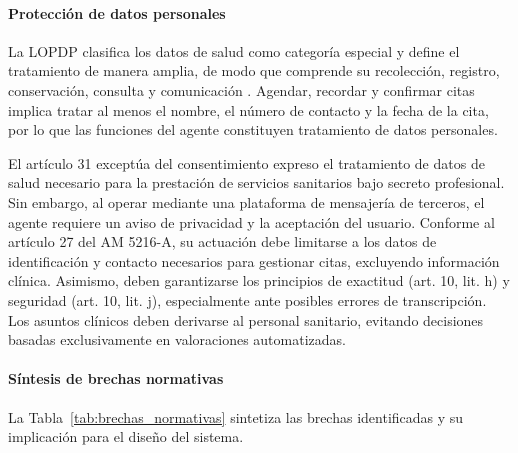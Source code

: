 \paragraph{Protección de datos personales}

La LOPDP clasifica los datos de salud como categoría especial y define el tratamiento de manera amplia, de modo que comprende su recolección, registro, conservación, consulta y comunicación \cite{lopdp2021}. Agendar, recordar y confirmar citas implica tratar al menos el nombre, el número de contacto y la fecha de la cita, por lo que las funciones del agente constituyen tratamiento de datos personales.

El artículo 31 exceptúa del consentimiento expreso el tratamiento de datos de salud necesario para la prestación de servicios sanitarios bajo secreto profesional. Sin embargo, al operar mediante una plataforma de mensajería de terceros, el agente requiere un aviso de privacidad y la aceptación del usuario. Conforme al artículo 27 del AM 5216-A, su actuación debe limitarse a los datos de identificación y contacto necesarios para gestionar citas, excluyendo información clínica. Asimismo, deben garantizarse los principios de exactitud (art. 10, lit. h) y seguridad (art. 10, lit. j), especialmente ante posibles errores de transcripción. Los asuntos clínicos deben derivarse al personal sanitario, evitando decisiones basadas exclusivamente en valoraciones automatizadas.

\paragraph{Síntesis de brechas normativas}

La Tabla~\ref{tab:brechas_normativas} sintetiza las brechas identificadas y su implicación para el diseño del sistema.

